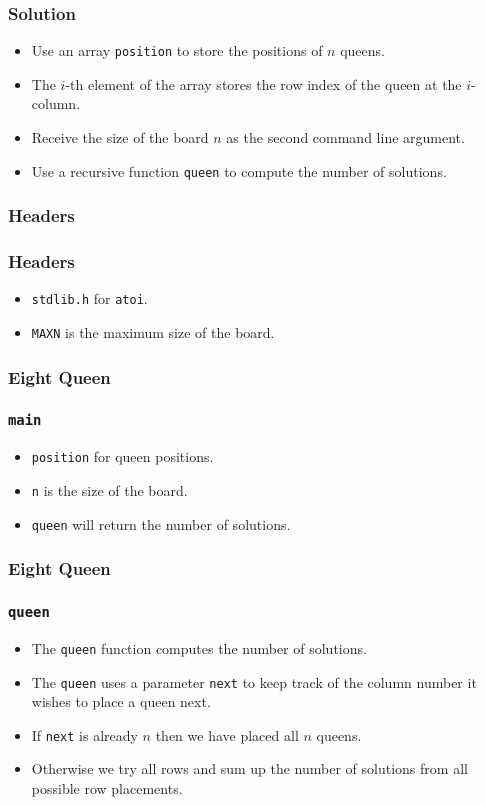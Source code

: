 \documentclass{beamer}
\begin{document}
\begin{frame}
\frametitle{Solution}
\begin{itemize}
\item Use an array {\tt position} to store the positions of $n$
  queens.
\item The $i$-th element of the array stores the row index of the
  queen at the $i$-column.
\item Receive the size of the board $n$ as the second command line
  argument.
\item Use a recursive function {\tt queen} to compute the number of
  solutions.
\end{itemize}
\end{frame}

\begin{frame}
\frametitle{Headers}
\end{frame}

\begin{frame}
\frametitle{Headers} 
\begin{itemize}
\item {\tt stdlib.h} for {\tt atoi}.
\item {\tt MAXN} is the maximum size of the board.
\end{itemize}
\end{frame}

\begin{frame}
\frametitle{Eight Queen}
\end{frame}

\begin{frame}
\frametitle{\tt main} 
\begin{itemize}
\item {\tt position} for queen positions.
\item {\tt n} is the size of the board.
\item {\tt queen} will return the number of solutions.
\end{itemize}
\end{frame}

\begin{frame}
\frametitle{Eight Queen}
\end{frame}

\begin{frame}
\frametitle{\tt queen}
\begin{itemize}
\item The {\tt queen} function computes the number of solutions.
\item The {\tt queen} uses a parameter {\tt next} to keep track of the
  column number it wishes to place a queen next.
\item If {\tt next} is already $n$ then we have placed all $n$ queens.
\item Otherwise we try all rows and sum up the number of solutions
  from all possible row placements.
\end{itemize}
\end{frame}
\end{document}
